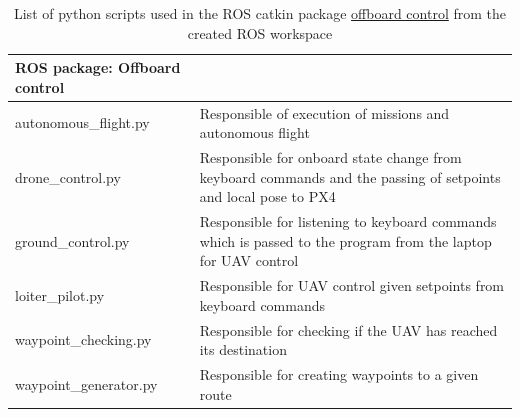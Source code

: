 \documentclass[../Head/report.tex]{subfiles}
\begin{document}
\begin{table}[H]
\begin{center}
\caption{List of python scripts used in the ROS catkin package \href{https://github.com/Kenil16/master\_project/tree/master/software/ros\_workspace/src/offboard\_control}{offboard control} from the created ROS workspace}
\label{tab:ros_package_offboard_control}
\begin{tabularx}{\textwidth}[t]{XX}
\arrayrulecolor{green}\hline
\textbf{\textcolor{myGreen}{ROS package: Offboard control}} & \\

\hline
autonomous\_flight.py & 
\begin{minipage}[t]{\linewidth}%
Responsible of execution of missions and autonomous flight  
\end{minipage}\vspace{0.5em} \\

\arrayrulecolor{black}\hline
drone\_control.py &
\begin{minipage}[t]{\linewidth}%
Responsible for onboard state change from keyboard commands and the passing of setpoints and local pose to PX4
\end{minipage}\vspace{0.5em}  \\

\hline
ground\_control.py &
\begin{minipage}[t]{\linewidth}%
Responsible for listening to keyboard commands which is passed to the program from the laptop for UAV control  
\end{minipage}\vspace{0.5em} \\

\hline
loiter\_pilot.py &
\begin{minipage}[t]{\linewidth}%
Responsible for UAV control given setpoints from keyboard commands   
\end{minipage}\vspace{0.5em}\\

\hline
waypoint\_checking.py &
\begin{minipage}[t]{\linewidth}%
Responsible for checking if the UAV has reached its destination 
\end{minipage}\vspace{0.5em}\\

\hline
waypoint\_generator.py &
\begin{minipage}[t]{\linewidth}%
Responsible for creating waypoints to a given route    
\end{minipage}\vspace{0.5em}\\


\end{tabularx}
\end{center}
\end{table}
\end{document}
